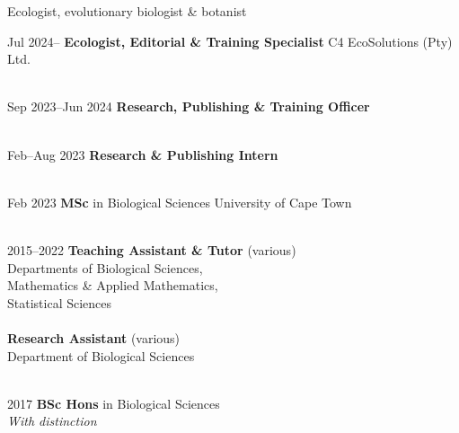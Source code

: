 \documentclass[12pt]{article}
\begin{document}



\bigskip

\begin{center}
  Ecologist, evolutionary biologist \& botanist
\end{center}

Jul 2024-- \hspace{5.15em} \textbf{Ecologist, Editorial \& Training Specialist}
          \hfill C4 EcoSolutions (Pty) Ltd. \\
\

Sep 2023--Jun 2024 \hspace{0.5em} \textbf{Research, Publishing \& Training Officer} \\
\

Feb--Aug 2023 \hspace{2.75em} \textbf{Research \& Publishing Intern} \\
\

Feb 2023   \hspace{5.1em} \textbf{MSc} in Biological Sciences
           \hfill University of Cape Town \\
\

2015--2022 \hspace{1.5em} \textbf{Teaching Assistant \& Tutor} (various) \\
           \hspace{6.75em} Departments of Biological Sciences, \\
                            \hspace{13em} Mathematics \& Applied Mathematics, \\
                            \hspace{13em} Statistical Sciences \\
           \ \\
           \hspace{6.75em} \textbf{Research Assistant} (various) \\
           \hspace{6.75em} Department of Biological Sciences \\
\

2017       \hspace{4.25em} \textbf{BSc Hons} in Biological Sciences \\
           \hspace{6.75em} \textit{With distinction} \\
\
\end{document}
